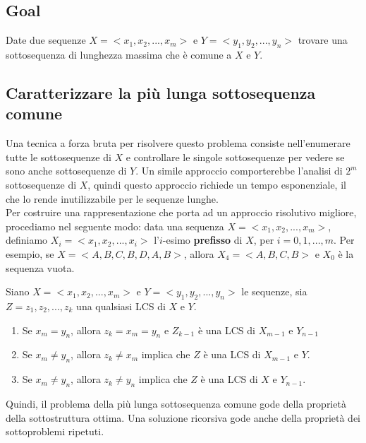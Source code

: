 \subsection{Goal}
\begin{myblockquote}
  Date due sequenze $X = <x_1, x_2, ..., x_m>$ e $Y = <y_1, y_2, ..., y_n>$
  trovare una sottosequenza di lunghezza massima che è comune a $X$ e $Y$.
\end{myblockquote}

\subsection{Caratterizzare la più lunga sottosequenza comune}

Una tecnica a forza bruta per risolvere questo problema consiste
nell'enumerare tutte le sottosequenze di $X$ e controllare le singole
sottosequenze per vedere se sono anche sottosequenze di $Y$. Un simile
approccio comporterebbe l'analisi di $2^m$ sottosequenze di $X$,
quindi questo approccio richiede un tempo esponenziale, il che lo rende
inutilizzabile per le sequenze lunghe.\\

Per costruire una rappresentazione che porta ad un approccio risolutivo
migliore, procediamo nel seguente modo: data una sequenza
$X = <x_1, x_2, ..., x_m>$, definiamo $X_i = <x_1, x_2, ..., x_i>$
l'$i$-esimo \textbf{prefisso} di $X$, per $i=0,1,...,m$. Per
esempio, se $X = <A,B,C,B,D,A,B>$, allora $X_4 = <A,B,C,B>$ e
$X_0$ è la sequenza vuota.

\begin{theorem}
  Siano $X = <x_1, x_2, ..., x_m>$ e $Y = <y_1, y_2, ..., y_n>$ le
  sequenze, sia $Z = z_1, z_2, ..., z_k$ una qualsiasi LCS di $X$ e
  $Y$.

  \begin{enumerate}
    \item Se $x_m = y_n$, allora $z_k = x_m = y_n$ e $Z_{k-1}$ è
          una LCS di $X_{m-1}$ e $Y_{n-1}$
    \item Se $x_m \ne y_n$, allora
          $z_k \ne x_m$ implica che $Z$ è una LCS di $X_{m-1}$ e $Y$.
    \item Se $x_m \ne y_n$, allora $z_k \ne y_n$ implica che $Z$ è una LCS
          di $X$ e $Y_{n-1}$.
  \end{enumerate}
\end{theorem}

Quindi, il problema della più lunga sottosequenza comune gode della
proprietà della sottostruttura ottima. Una soluzione ricorsiva gode
anche della proprietà dei sottoproblemi ripetuti.

